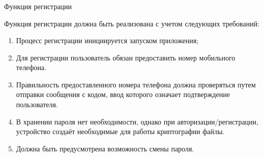 \subsubsection{} Функция регистрации
\label{sec:analysis:research:funcreq:registration}


Функция регистрации должна быть реализована с учетом следующих требований:

\begin{enumerate}
	\item Процесс регистрации инициируется запуском приложения;
	\item Для регистрации пользователь обязан предоставить номер мобильного телефона.
	\item Правильность предоставленного номера телефона должна проверяться путем отправки сообщения с кодом, ввод которого означает подтверждение пользователя.
	\item В хранении пароля нет необходимости, однако при авторизации/регистрации, устройство создаёт необходимые для работы криптографии файлы.
	\item Должна быть предусмотрена возможность смены пароля.
\end{enumerate}